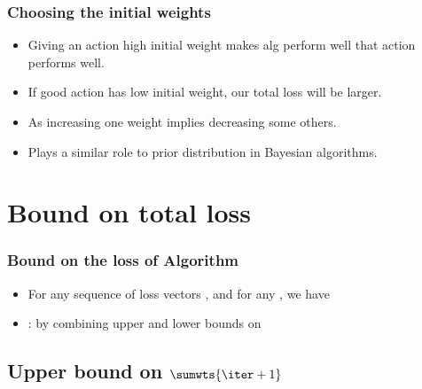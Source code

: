 \documentclass[handout]{beamer}
\begin{document}
\begin{frame} 
\frametitle{Choosing the initial weights} 

\begin{itemize}
\item Giving an action high initial weight makes alg perform well
   that action performs well.
\item If good action has low initial weight, our total loss will
  be larger.
\item As  increasing one weight
  implies decreasing some others.
\item Plays a similar role to prior distribution in Bayesian
  algorithms.
\end{itemize}

\end{frame} 

\section{Bound on total loss}
\begin{frame}
\frametitle{Bound on the loss of \ouralg Algorithm}
\begin{itemize}
\item
\begin{theorem} \label{thm:basic-bnd}
For any sequence of loss vectors ,
and for any , we have
\end{theorem}
\item
{}: by combining upper and lower bounds on 
\end{itemize}
\end{frame}

\subsection{Upper bound on $\sumwts{\iter+1}$}
\end{document}
